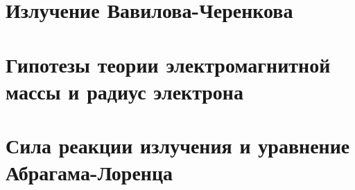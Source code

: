 \begin{multicols*}{2}
		\section{Излучение Вавилова-Черенкова}
		
		\section{Гипотезы теории электромагнитной массы и радиус электрона}
		
		\section{Сила реакции излучения и уравнение Абрагама-Лоренца}
		
	\end{multicols*}

